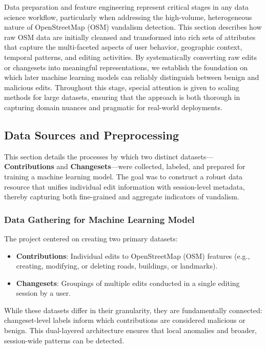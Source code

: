 \documentclass[
    13pt, %
    a4paper, %
    twoside, 
    DIV14, %
    listof=totoc, %
    bibliography=totoc, %
    index=totoc, %
    headsepline
]{scrreprt}
\begin{document}
Data preparation and feature engineering represent critical stages in any data science workflow, particularly when addressing the high-volume, heterogeneous nature of OpenStreetMap (OSM) vandalism detection. This section describes how raw OSM data are initially cleansed and transformed into rich sets of attributes that capture the multi-faceted aspects of user behavior, geographic context, temporal patterns, and editing activities. By systematically converting raw edits or changesets into meaningful representations, we establish the foundation on which later machine learning models can reliably distinguish between benign and malicious edits. Throughout this stage, special attention is given to scaling methods for large datasets, ensuring that the approach is both thorough in capturing domain nuances and pragmatic for real-world deployments.

\subsection{Data Sources and Preprocessing}
\label{sec:data_sources_preprocessing}

This section details the processes by which two distinct datasets—\textbf{Contributions} and \textbf{Changesets}—were collected, labeled, and prepared for training a machine learning model. The goal was to construct a robust data resource that unifies individual edit information with session-level metadata, thereby capturing both fine-grained and aggregate indicators of vandalism.

\subsubsection{Data Gathering for Machine Learning Model}
\noindent
The project centered on creating two primary datasets:
\begin{itemize}
    \item \textbf{Contributions}: Individual edits to OpenStreetMap (OSM) features (e.g., creating, modifying, or deleting roads, buildings, or landmarks).
    \item \textbf{Changesets}: Groupings of multiple edits conducted in a single editing session by a user.
\end{itemize}
While these datasets differ in their granularity, they are fundamentally connected: changeset-level labels inform which contributions are considered malicious or benign. This dual-layered architecture ensures that local anomalies and broader, session-wide patterns can be detected.
\end{document}
